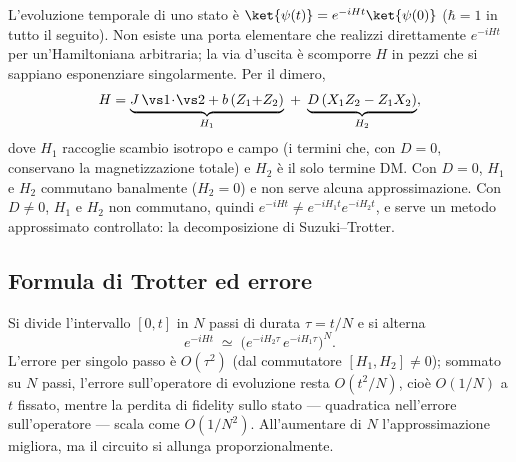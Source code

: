\documentclass[11pt,a4paper]{article}
\begin{document}
L'evoluzione temporale di uno stato è $\ket{\psi(t)}=e^{-iHt}\ket{\psi(0)}$
($\hbar=1$ in tutto il seguito). Non esiste una porta elementare che
realizzi direttamente $e^{-iHt}$ per un'Hamiltoniana arbitraria; la via
d'uscita è scomporre $H$ in pezzi che si sappiano esponenziare
singolarmente. Per il dimero,
\begin{equation}
H = \underbrace{J\,\vs1\!\cdot\!\vs2 + b\,(Z_1{+}Z_2)}_{H_1}
  \;+\; \underbrace{D\,(X_1Z_2-Z_1X_2)}_{H_2},
\label{eq:H1H2}
\end{equation}
dove $H_1$ raccoglie scambio isotropo e campo (i termini che, con $D=0,$
conservano la magnetizzazione totale) e $H_2$ è il solo termine DM. Con
$D=0$, $H_1$ e $H_2$ commutano banalmente ($H_2=0$) e non serve alcuna
approssimazione. Con $D\neq0$, $H_1$ e $H_2$ non commutano, quindi
$e^{-iHt}\neq e^{-iH_1t}e^{-iH_2t}$, e serve un metodo approssimato
controllato: la decomposizione di Suzuki--Trotter.

\subsection{Formula di Trotter ed errore}

Si divide l'intervallo $[0,t]$ in $N$ passi di durata $\tau=t/N$ e si
alterna
\begin{equation}
e^{-iHt} \;\simeq\; \Big(e^{-iH_2\tau}\,e^{-iH_1\tau}\Big)^{N}.
\label{eq:trotter}
\end{equation}
L'errore per singolo passo è $O(\tau^2)$ (dal commutatore
$[H_1,H_2]\neq0$); sommato su $N$ passi, l'errore sull'operatore di
evoluzione resta $O(t^2/N)$, cioè $O(1/N)$ a $t$ fissato, mentre la
perdita di fidelity sullo stato --- quadratica nell'errore
sull'operatore --- scala come $O(1/N^2)$. All'aumentare di $N$
l'approssimazione migliora, ma il circuito si allunga proporzionalmente.
\end{document}
